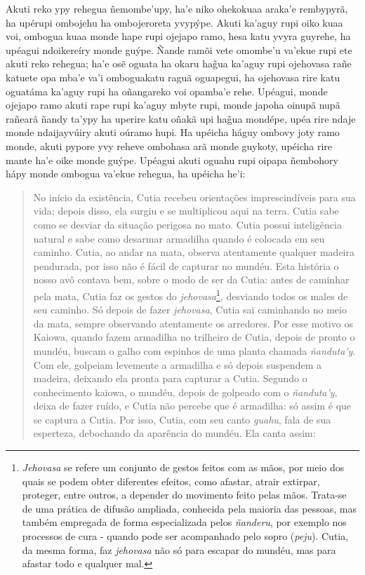 \begin{itemize}
Akuti reko ypy rehegua ñemombe'upy, ha'e niko ohekokuaa araka'e
rembypyrã, ha upérupi ombojehu ha ombojeroreta yvypýpe. Akuti ka'aguy
rupi oiko kuaa voi, ombogua kuaa monde hape rupi ojejapo ramo, hesa katu
yvyra guyrehe, ha upéagui ndoikereíry monde guýpe. Ñande ramõi vete
omombe'u va'ekue rupi ete akuti reko rehegua; ha'e osẽ oguata ha okaru
hag̃ua ka'aguy rupi ojehovasa rañe katuete opa mba'e va'i omboguakatu
raguã oguapegui, ha ojehovasa rire katu oguatáma ka'aguy rupi ha
oñangareko voi opamba'e rehe. Upéagui, monde ojejapo ramo akuti rape
rupi ka'aguy mbyte rupi, monde japoha oinupã nupã rañearã ñandy ta'ypy
ha uperire katu oñakã upi hag̃ua mondépe, upéa rire ndaje monde
ndaijayvúiry akuti oúramo hupi. Ha upéicha háguy ombovy joty ramo monde,
akuti pypore yvy reheve ombohasa arã monde guykoty, upéicha rire mante
ha'e oike monde guýpe. Upéagui akuti oguahu rupi oipapa ñembohory hápy
monde ombogua va'ekue rehegua, ha upéicha he'i:

\begin{quote}
No início da existência, Cutia recebeu orientações imprescindíveis para
sua vida; depois disso, ela surgiu e se multiplicou aqui na terra. Cutia
sabe como se desviar da situação perigosa no mato. Cutia possui
inteligência natural e sabe como desarmar armadilha quando é colocada em
seu caminho. Cutia, ao andar na mata, observa atentamente qualquer
madeira pendurada, por isso não é fácil de capturar no mundéu. Esta
história o nosso avô contava bem, sobre o modo de ser da Cutia: antes de
caminhar pela mata, Cutia faz os gestos do \emph{jehovasa}\footnote{\emph{Jehovasa}
  se refere um conjunto de gestos feitos com as mãos, por meio dos quais
  se podem obter diferentes efeitos, como afastar, atrair extirpar,
  proteger, entre outros, a depender do movimento feito pelas mãos.
  Trata-se de uma prática de difusão ampliada, conhecida pela maioria
  das pessoas, mas também empregada de forma especializada pelos
  \emph{ñanderu}, por exemplo nos processos de cura - quando pode ser
  acompanhado pelo sopro (\emph{peju}). Cutia, da mesma forma, faz
  \emph{jehovasa} não só para escapar do mundéu, mas para afastar todo e
  qualquer mal.}, desviando todos os males de seu caminho. Só depois de
fazer \emph{jehovasa}, Cutia sai caminhando no meio da mata, sempre
observando atentamente os arredores. Por esse motivo os Kaiowa, quando
fazem armadilha no trilheiro de Cutia, depois de pronto o mundéu, buscam
o galho com espinhos de uma planta chamada \emph{ñanduta'y}. Com ele,
golpeiam levemente a armadilha e só depois suspendem a madeira, deixando
ela pronta para capturar a Cutia. Segundo o conhecimento kaiowa, o
mundéu, depois de golpeado com o \emph{ñanduta'y}, deixa de fazer ruído,
e Cutia não percebe que é armadilha: só assim é que se captura a Cutia.
Por isso, Cutia, com seu canto \emph{guahu}, fala de sua esperteza,
debochando da aparência do mundéu. Ela canta assim:
\end{quote}



\end{itemize}
